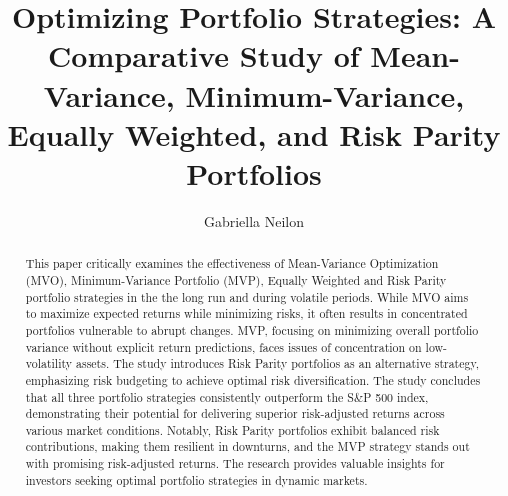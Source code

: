 \documentclass[12pt,preprint, authoryear]{elsarticle}
\numberwithin{equation}{section}
\numberwithin{figure}{section}
\numberwithin{table}{section}
\begin{document}
\begin{frontmatter}  %

\title{Optimizing Portfolio Strategies: A Comparative Study of
Mean-Variance, Minimum-Variance, Equally Weighted, and Risk Parity
Portfolios}





\author[Add1]{Gabriella Neilon}





\address[Add1]{Stellenbosch University}


\begin{abstract}
\small{
This paper critically examines the effectiveness of Mean-Variance
Optimization (MVO), Minimum-Variance Portfolio (MVP), Equally Weighted
and Risk Parity portfolio strategies in the the long run and during
volatile periods. While MVO aims to maximize expected returns while
minimizing risks, it often results in concentrated portfolios vulnerable
to abrupt changes. MVP, focusing on minimizing overall portfolio
variance without explicit return predictions, faces issues of
concentration on low-volatility assets. The study introduces Risk Parity
portfolios as an alternative strategy, emphasizing risk budgeting to
achieve optimal risk diversification. The study concludes that all three
portfolio strategies consistently outperform the S\&P 500 index,
demonstrating their potential for delivering superior risk-adjusted
returns across various market conditions. Notably, Risk Parity
portfolios exhibit balanced risk contributions, making them resilient in
downturns, and the MVP strategy stands out with promising risk-adjusted
returns. The research provides valuable insights for investors seeking
optimal portfolio strategies in dynamic markets.
}
\end{abstract}

\vspace{1cm}





\vspace{0.5cm}

\end{frontmatter}

\setcounter{footnote}{0}


\renewcommand{\contentsname}{Table of Contents}
{\tableofcontents}
\end{document}
